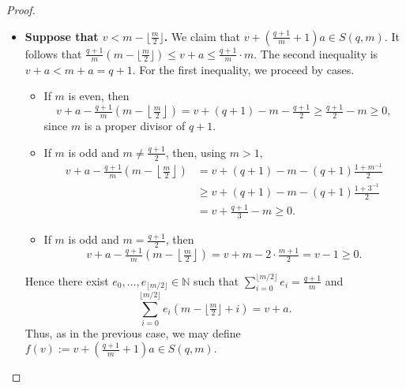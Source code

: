 \documentclass[12pt]{amsart}
\theoremstyle{remark}
\theoremstyle{definition}
\newcommand{\coloneqq}{\mathrel{:=}}
\begin{document}
\begin{proof}
\begin{itemize}
        \item \textbf{Suppose that $v < m - \lfloor\frac{m}{2}\rfloor$.}
        We claim that
        $v + \left(\frac{q+1}{m}+1\right)a \in S(q,m)$.
        It follows that
        $\frac{q+1}{m}\!\left(m-\lfloor\tfrac{m}{2}\rfloor\right)
        \le v+a \le \frac{q+1}{m} \cdot m$.
        The second inequality is $v + a < m + a = q+1$.
        For the first inequality, we proceed by cases.
        \begin{itemize}
            \item If $m$ is even, then
            \[
                v + a - \tfrac{q+1}{m}\!\left(m-\left\lfloor\tfrac{m}{2}
                \right\rfloor\right)
                = v + (q+1) - m - \tfrac{q+1}{2}
                \ge \tfrac{q+1}{2} - m \ge 0,
            \]
            since $m$ is a proper divisor of $q+1$.
            \item If $m$ is odd and $m \neq \frac{q+1}{2}$, then,
            using $m > 1$,
            \begin{align*}
                v + a - \tfrac{q+1}{m}\!\left(m-\left\lfloor\tfrac{m}{2}
                \right\rfloor\right)
                &= v + (q+1) - m - (q+1)\tfrac{1+m^{-1}}{2} \\
                &\ge v + (q+1) - m - (q+1)\tfrac{1+3^{-1}}{2} \\
                &= v + \tfrac{q+1}{3} - m \ge 0.
            \end{align*}
            \item If $m$ is odd and $m = \frac{q+1}{2}$, then
            \[
                v + a - \tfrac{q+1}{m}\!\left(m-\left\lfloor\tfrac{m}{2}
                \right\rfloor\right)
                = v + m - 2\cdot\tfrac{m+1}{2} = v - 1 \ge 0.
            \]
        \end{itemize}
        Hence there exist $e_0,\ldots,e_{\lfloor m/2\rfloor} \in \mathbb{N}$
        such that $\sum_{i=0}^{\lfloor m/2\rfloor} e_i = \frac{q+1}{m}$ and
        $$\sum_{i=0}^{\lfloor m/2\rfloor} e_i
        \!\left(m-\lfloor\tfrac{m}{2}\rfloor+i\right) = v+a.$$
        Thus, as in the previous case, we may define
        $f(v) \coloneqq v + \left(\frac{q+1}{m}+1\right)a \in S(q,m)$.
    \end{itemize}


\end{proof}
\end{document}
